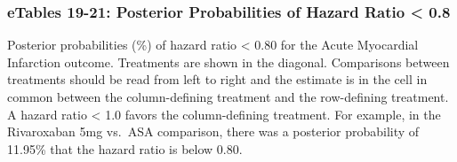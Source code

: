 \documentclass[
  12pt,
]{article}
\begin{document}
\newpage

\begin{landscape}

\hypertarget{etables-19-21-posterior-probabilities-of-hazard-ratio-0.8}{%
\subsubsection{eTables 19-21: Posterior Probabilities of Hazard Ratio
\textless{}
0.8}\label{etables-19-21-posterior-probabilities-of-hazard-ratio-0.8}}

\begin{table}[!h]

\caption{\label{tab:unnamed-chunk-41}Acute Myocardial Infarction}
\centering
{}
\end{table}

Posterior probabilities (\%) of hazard ratio \textless{} 0.80 for the
Acute Myocardial Infarction outcome. Treatments are shown in the
diagonal. Comparisons between treatments should be read from left to
right and the estimate is in the cell in common between the
column-defining treatment and the row-defining treatment. A hazard ratio
\textless{} 1.0 favors the column-defining treatment. For example, in
the Rivaroxaban 5mg vs.~ASA comparison, there was a posterior
probability of 11.95\% that the hazard ratio is below 0.80.

\end{landscape}

\begin{table}[!h]

\caption{\label{tab:unnamed-chunk-42}Ischemic Stroke}
\centering
{}
\end{table}
\end{document}
